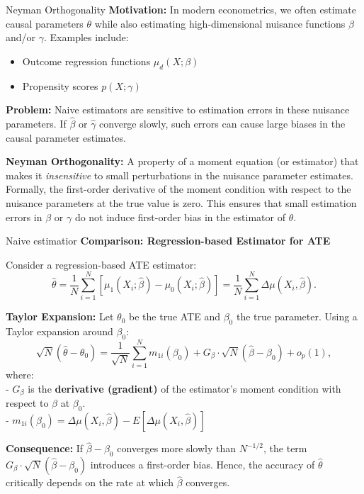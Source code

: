 \documentclass[xcolor=svgnames,t]{beamer}
\begin{document}
\begin{frame}{Neyman Orthogonality }
    \textbf{Motivation:} In modern econometrics, we often estimate causal parameters \(\theta\) while also estimating high-dimensional nuisance functions \(\beta\) and/or \(\gamma\). Examples include:
    \begin{itemize}
        \item Outcome regression functions \(\mu_d(X; \beta)\)
        \item Propensity scores \(p(X; \gamma)\)
    \end{itemize}
    
    \pause
    
    \textbf{Problem:} Naive estimators are sensitive to estimation errors in these nuisance parameters. If \(\widehat{\beta}\) or \(\widehat{\gamma}\) converge slowly, such errors can cause large biases in the causal parameter estimates.
    
    \pause
    
    \textbf{Neyman Orthogonality:} A property of a moment equation (or estimator) that makes it \emph{insensitive} to small perturbations in the nuisance parameter estimates. Formally, the first-order derivative of the moment condition with respect to the nuisance parameters at the true value is zero. This ensures that small estimation errors in \(\beta\) or \(\gamma\) do not induce first-order bias in the estimator of \(\theta\).
    \end{frame}
    
    
    \begin{frame}{Naive estimatior}
    \textbf{Comparison: Regression-based Estimator for ATE}
    
    Consider a regression-based ATE estimator:
    \[
    \widehat{\theta} = \frac{1}{N}\sum_{i=1}^N [\mu_1(X_i; \widehat{\beta}) - \mu_0(X_i; \widehat{\beta})] = \frac{1}{N} \sum^N_{i=1} \Delta \mu (X_i, \hat{\beta}).
    \]
    
    \pause
    
    \textbf{Taylor Expansion:} Let \(\theta_0\) be the true ATE and \(\beta_0\) the true parameter. Using a Taylor expansion around \(\beta_0\):
    \[
    \sqrt{N}(\widehat{\theta} - \theta_0) = \frac{1}{\sqrt{N}}\sum_{i=1}^N m_{1i}(\beta_0) 
    + G_{\beta} \cdot \sqrt{N}(\widehat{\beta}-\beta_0) + o_p(1),
    \]
    \pause
    \scriptsize
    where: \\
    - \(G_{\beta}\) is the \textbf{derivative (gradient)} of the estimator's moment condition with respect to \(\beta\) at \(\beta_0\).\\
    \pause
    - $m_{1i}(\beta_0)=\Delta \mu (X_i, \hat{\beta}) - E[\Delta \mu (X_i, \hat{\beta})] $ 
    
    \pause
    
    \textbf{Consequence:}
    If \(\widehat{\beta}-\beta_0\) converges more slowly than \(N^{-1/2}\), the term \(G_{\beta} \cdot \sqrt{N}(\widehat{\beta}-\beta_0)\) introduces a first-order bias. Hence, the accuracy of \(\widehat{\theta}\) critically depends on the rate at which \(\widehat{\beta}\) converges.
    
    \end{frame}
    
\end{document}
